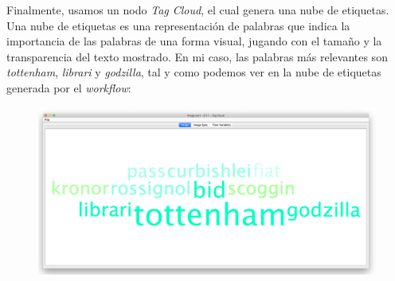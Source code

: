 \documentclass[11pt]{article}
\begin{document}
Finalmente, usamos un nodo \textit{Tag Cloud}, el cual genera una nube de etiquetas. Una nube de etiquetas es una representación de palabras que indica la importancia de las palabras de una forma visual, jugando con el tamaño y la transparencia del texto mostrado. En mi caso, las palabras más relevantes son \textit{tottenham}, \textit{librari} y \textit{godzilla}, tal y como podemos ver en la nube de etiquetas generada por el \textit{workflow}:

\begin{figure}[H]
	\centering
	\includegraphics[width=0.9\linewidth]{images/words.png}
\end{figure}
\end{document}
